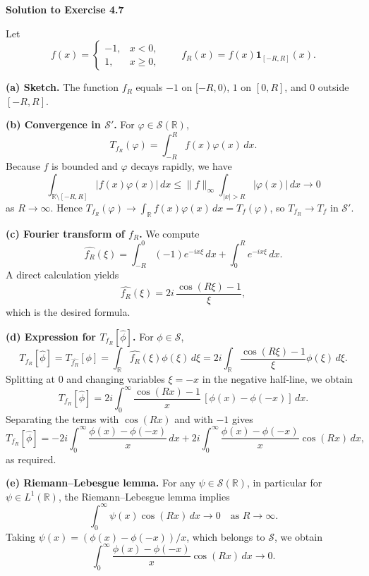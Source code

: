 \begin{solution}

\par\medskip\noindent\textbf{Solution to Exercise 4.7}\par\smallskip


Let
\[
f(x) =
\begin{cases}
	-1, & x<0,\\[0.2em]
	1,  & x\ge 0,
\end{cases}
\qquad
f_R(x) = f(x)\mathbf{1}_{[-R,R]}(x).
\]

\par\medskip\noindent\textbf{(a) Sketch.}\quad
The function $f_R$ equals $-1$ on $[-R,0)$, $1$ on $[0,R]$, and $0$ outside
$[-R,R]$.

\par\medskip\noindent\textbf{(b) Convergence in $\mathcal{S}'$.}\quad
For $\varphi\in\mathcal{S}(\mathbb{R})$,
\[
T_{f_R}(\varphi)
= \int_{-R}^{R} f(x)\varphi(x)\,dx.
\]
Because $f$ is bounded and $\varphi$ decays rapidly, we have
\[
\int_{\mathbb{R}\setminus[-R,R]} |f(x)\varphi(x)|\,dx
\le \|f\|_{\infty}\int_{|x|>R} |\varphi(x)|\,dx \to 0
\]
as $R\to\infty$.  Hence
$T_{f_R}(\varphi)\to \int_{\mathbb{R}} f(x)\varphi(x)\,dx = T_f(\varphi)$,
so $T_{f_R}\to T_f$ in $\mathcal{S}'$.

\par\medskip\noindent\textbf{(c) Fourier transform of $f_R$.}\quad
We compute
\[
\widehat{f_R}(\xi)
= \int_{-R}^{0} (-1)e^{-ix\xi}\,dx + \int_{0}^{R} e^{-ix\xi}\,dx.
\]
A direct calculation yields
\[
\widehat{f_R}(\xi)
= 2i\,\frac{\cos(R\xi)-1}{\xi},
\]
which is the desired formula.

\par\medskip\noindent\textbf{(d) Expression for $T_{f_R}[\widehat{\phi}]$.}\quad
For $\phi\in\mathcal{S}$,
\[
T_{f_R}[\widehat{\phi}]
= T_{\widehat{f_R}}[\phi]
= \int_{\mathbb{R}} \widehat{f_R}(\xi)\phi(\xi)\,d\xi
= 2i\int_{\mathbb{R}} \frac{\cos(R\xi)-1}{\xi}\phi(\xi)\,d\xi.
\]
Splitting at $0$ and changing variables $\xi=-x$ in the negative half-line,
we obtain
\[
T_{f_R}[\widehat{\phi}]
= 2i\int_0^{\infty} \frac{\cos(Rx)-1}{x}\,[\phi(x)-\phi(-x)]\,dx.
\]
Separating the terms with $\cos(Rx)$ and with $-1$ gives
\[
T_{f_R}[\widehat{\phi}]
= -2i\int_0^{\infty} \frac{\phi(x)-\phi(-x)}{x}\,dx
+ 2i\int_0^{\infty} \frac{\phi(x)-\phi(-x)}{x}\cos(Rx)\,dx,
\]
as required.

\par\medskip\noindent\textbf{(e) Riemann--Lebesgue lemma.}\quad
For any $\psi\in\mathcal{S}(\mathbb{R})$, in particular for
$\psi\in L^{1}(\mathbb{R})$, the Riemann--Lebesgue lemma implies
\[
\int_0^{\infty} \psi(x)\cos(Rx)\,dx \to 0
\quad\text{as } R\to\infty.
\]
Taking $\psi(x)=(\phi(x)-\phi(-x))/x$, which belongs to $\mathcal{S}$, we
obtain
\[
\int_0^{\infty} \frac{\phi(x)-\phi(-x)}{x}\cos(Rx)\,dx \to 0.
\]


\end{solution}
